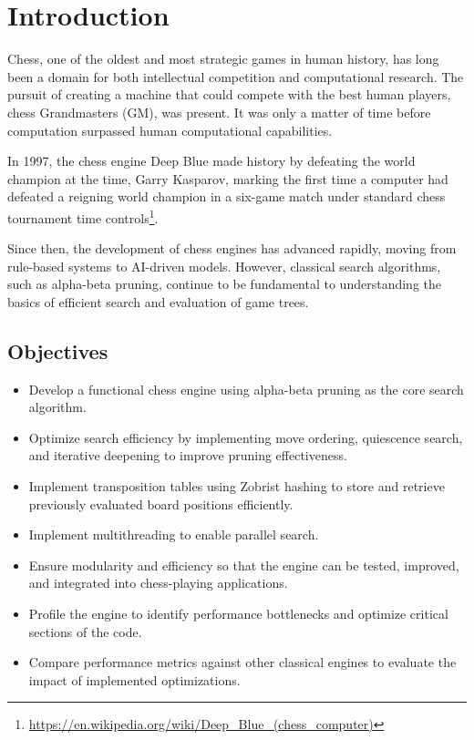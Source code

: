\chapter{Introduction}
\label{cap:introduction}


Chess, one of the oldest and most strategic games in human history, has long been a domain for both intellectual competition and computational research. The pursuit of creating a machine that could compete with the best human players, chess Grandmasters (GM), was present. It was only a matter of time before computation surpassed human computational capabilities.

In 1997, the chess engine Deep Blue made history by defeating the world champion at the time, Garry Kasparov, marking the first time a computer had defeated a reigning world champion in a six-game match under standard chess tournament time controls\footnote{\url{https://en.wikipedia.org/wiki/Deep_Blue_(chess_computer)}}.

Since then, the development of chess engines has advanced rapidly, moving from rule-based systems to AI-driven models. However, classical search algorithms, such as alpha-beta pruning, continue to be fundamental to understanding the basics of efficient search and evaluation of game trees.


\section{Objectives}

\begin{itemize}
    \item Develop a functional chess engine using alpha-beta pruning as the core search algorithm.
    \item Optimize search efficiency by implementing move ordering, quiescence search, and iterative deepening to improve pruning effectiveness.
    \item Implement transposition tables using Zobrist hashing to store and retrieve previously evaluated board positions efficiently.
    \item Implement multithreading to enable parallel search.
    \item Ensure modularity and efficiency so that the engine can be tested, improved, and integrated into chess-playing applications.
    \item Profile the engine to identify performance bottlenecks and optimize critical sections of the code.
    \item Compare performance metrics against other classical engines to evaluate the impact of implemented optimizations.
\end{itemize}

